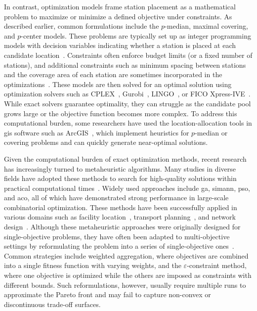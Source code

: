 In contrast, optimization models frame station placement as a mathematical problem to maximize or minimize a defined objective under constraints. As described earlier, common formulations include the $p$-median, maximal covering, and $p$-center models. These problems are typically set up as integer programming models with decision variables indicating whether a station is placed at each candidate location~\cite{Frade2015, Lin2011, Mete2018, Cintrano2018}. Constraints often enforce budget limits (or a fixed number of stations), and additional constraints such as minimum spacing between stations and the coverage area of each station are sometimes incorporated in the optimizations~\cite{Conrow2018, Nikiforiadis2021, Caggiani2020}. These models are then solved for an optimal solution using optimization solvers such as CPLEX~\cite{Mete2018, Chou2019}, Gurobi~\cite{Mix2022},  LINGO~\cite{Lin2011}, or FICO Xpress-IVE~\cite{Conrow2018}. While exact solvers guarantee optimality, they can struggle as the candidate pool grows large or the objective function becomes more complex. To address this computational burden, some researchers have used the location-allocation tools in \ac{gis} software such as ArcGIS~\cite{GarciaPalomares2012, Ebrahimi2022}, which implement heuristics for $p$-median or covering problems and can quickly generate near-optimal solutions.

Given the computational burden of exact optimization methods, recent research has increasingly turned to metaheuristic algorithms. Many studies in diverse fields have adopted these methods to search for high-quality solutions within practical computational times~\cite{Tomar2023}. Widely used approaches include \ac{ga}, \ac{simann}, \ac{pso}, and \ac{aco}, all of which have demonstrated strong performance in large-scale combinatorial optimization. These methods have been successfully applied in various domains such as facility location~\cite{Chadry2003, Chalupa2019}, transport planning~\cite{Holliday2023, Sachan2024}, and network design~\cite{Gallo2010, Madadi2024}. Although these metaheuristic approaches were originally designed for single-objective problems, they have often been adapted to multi-objective settings by reformulating the problem into a series of single-objective ones~\cite{Rahimi2023}. Common strategies include weighted aggregation, where objectives are combined into a single fitness function with varying weights, and the $\varepsilon$-constraint method, where one objective is optimized while the others are imposed as constraints with different bounds. Such reformulations, however, usually require multiple runs to approximate the Pareto front and may fail to capture non-convex or discontinuous trade-off surfaces.

